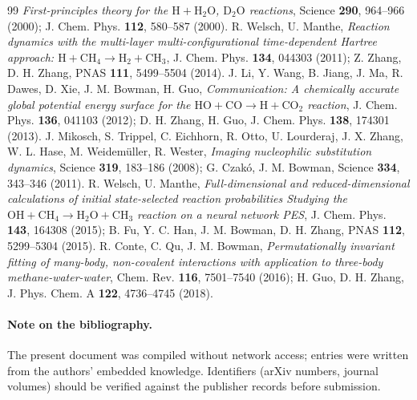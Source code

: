 \documentclass[11pt,a4paper]{article}
\begin{document}
\begin{thebibliography}{99}
\emph{First-principles theory for the $\mathrm{H + H_2O}$, $\mathrm{D_2O}$ reactions},
Science \textbf{290}, 964--966 (2000); J. Chem. Phys. \textbf{112}, 580--587 (2000).
 R. Welsch, U. Manthe,
\emph{Reaction dynamics with the multi-layer multi-configurational time-dependent Hartree approach: $\mathrm{H + CH_4 \to H_2 + CH_3}$},
J. Chem. Phys. \textbf{134}, 044303 (2011); Z. Zhang, D. H. Zhang, PNAS \textbf{111}, 5499--5504 (2014).
 J. Li, Y. Wang, B. Jiang, J. Ma, R. Dawes, D. Xie, J. M. Bowman, H. Guo,
\emph{Communication: A chemically accurate global potential energy surface for the $\mathrm{HO + CO \to H + CO_2}$ reaction},
J. Chem. Phys. \textbf{136}, 041103 (2012); D. H. Zhang, H. Guo, J. Chem. Phys. \textbf{138}, 174301 (2013).
 J. Mikosch, S. Trippel, C. Eichhorn, R. Otto, U. Lourderaj, J. X. Zhang, W. L. Hase, M. Weidem\"uller, R. Wester,
\emph{Imaging nucleophilic substitution dynamics},
Science \textbf{319}, 183--186 (2008); G. Czak\'o, J. M. Bowman, Science \textbf{334}, 343--346 (2011).
 R. Welsch, U. Manthe,
\emph{Full-dimensional and reduced-dimensional calculations of initial state-selected reaction probabilities Studying the $\mathrm{OH + CH_4 \to H_2O + CH_3}$ reaction on a neural network PES},
J. Chem. Phys. \textbf{143}, 164308 (2015); B. Fu, Y. C. Han, J. M. Bowman, D. H. Zhang, PNAS \textbf{112}, 5299--5304 (2015).
 R. Conte, C. Qu, J. M. Bowman,
\emph{Permutationally invariant fitting of many-body, non-covalent interactions with application to three-body methane-water-water},
Chem. Rev. \textbf{116}, 7501--7540 (2016); H. Guo, D. H. Zhang, J. Phys. Chem. A \textbf{122}, 4736--4745 (2018).
\end{thebibliography}

\paragraph{Note on the bibliography.} The present document was compiled without
network access; entries were written from the authors' embedded knowledge.
Identifiers (arXiv numbers, journal volumes) should be verified against the
publisher records before submission.
\end{document}
